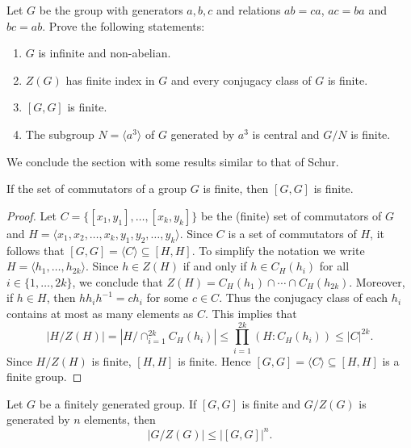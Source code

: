 \begin{exercise}
    Let $G$ be the group with generators $a,b,c$ and 
    relations $ab=ca$, $ac=ba$ and $bc=ab$. Prove the following statements:
    \begin{enumerate}
        \item $G$ is infinite and non-abelian.
        \item $Z(G)$ has finite index in $G$ and every conjugacy class of $G$ is finite.
        \item $[G,G]$ is finite. 
        \item The subgroup $N=\langle a^3\rangle$ of $G$ 
        generated by $a^3$ is central 
        and $G/N$ is finite.
    \end{enumerate}
\end{exercise}

We conclude the section with some results similar to that of Schur. 

\begin{theorem}[Niroomand]
\label{thm:Niroomand}
	If the set of commutators of a group $G$ is finite, then 
	$[G,G]$ is finite.
\end{theorem}

\begin{proof}
 	Let $C=\{[x_1,y_1],\dots,[x_k,y_k]\}$ be the (finite) set of commutators of $G$ and  
	$H=\langle x_1,x_2,\dots,x_k,y_1,y_2,\dots,y_k\rangle$. Since $C$ is a set of commutators of $H$, 
	it follows that 
	$[G,G]=\langle C\rangle\subseteq [H,H]$. To simplify the notation we write 
	$H=\langle h_1,\dots,h_{2k}\rangle$. 	
 	Since $h\in Z(H)$ if and only if $h\in C_H(h_i)$ for all 
	$i\in\{1,\dots,2k\}$, we conclude that $Z(H)=C_H(h_1)\cap\cdots\cap C_H(h_{2k})$. Moreover, if 
	$h\in H$, then $hh_ih^{-1}=ch_i$ for some $c\in C$. Thus the conjugacy class of each 
	$h_i$ contains at most as many elements as $C$. This implies that 
	\[
		|H/Z(H)|=|H/\cap_{i=1}^{2k} C_H(h_i)|\leq\prod_{i=1}^{2k} (H:C_H(h_i))\leq |C|^{2k}.
	\]
	Since $H/Z(H)$ is finite, $[H,H]$ is finite. Hence  
	$[G,G]=\langle C\rangle\subseteq [H,H]$ 
	is a finite group. 
\end{proof}

\begin{theorem}
	\label{thm:HiltonNiroomand}
	Let $G$ be a finitely generated group. If $[G,G]$ is finite and $G/Z(G)$ is generated by
	$n$ elements, then  
	\[
	|G/Z(G)|\leq |[G,G]|^n. 
	\]
\end{theorem}

